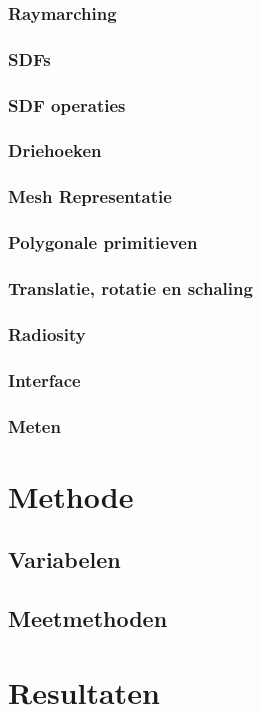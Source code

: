 \documentclass[12pt, a4paper]{article}
\begin{document}
\subsubsection{Raymarching}
\subsubsection{SDFs}
\subsubsection{SDF operaties}
\subsubsection{Driehoeken}
\subsubsection{Mesh Representatie}
\subsubsection{Polygonale primitieven}
\subsubsection{Translatie, rotatie en schaling}
\subsubsection{Radiosity}
\subsubsection{Interface}
\subsubsection{Meten}
\clearpage
\section{Methode}
\subsection{Variabelen}
\subsection{Meetmethoden}
\clearpage
\section{Resultaten}
\end{document}
